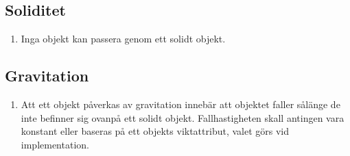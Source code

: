 \documentclass{TDP003mall}
\begin{document}
\subsection{Soliditet}
\begin{enumerate}
\item Inga objekt kan passera genom ett solidt objekt.
\end{enumerate}

\subsection{Gravitation}
\begin{enumerate}
\item Att ett objekt påverkas av gravitation innebär att objektet faller sålänge de inte befinner sig ovanpå ett solidt objekt. Fallhastigheten skall antingen vara konstant eller baseras på ett objekts viktattribut, valet görs vid implementation.
\end{enumerate}
\end{document}
